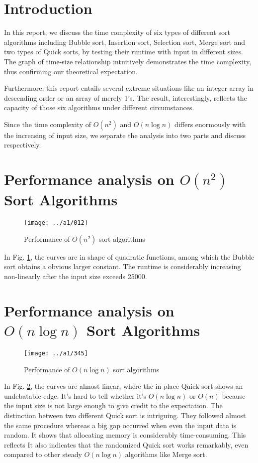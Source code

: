 
\section{Introduction}
In this report, we discuss the time complexity of six types of different sort algorithms including Bubble sort, Insertion sort, Selection sort, Merge sort and two types of Quick sorts, by testing their runtime with input in different sizes. The graph of time-size relationship intuitively demonstrates the time complexity, thus confirming our theoretical expectation.

Furthermore, this report entails several extreme situations like an integer array in descending order or an array of merely 1's. The result, interestingly, reflects the capacity of those six algorithms under different circumstances.

Since the time complexity of $O(n^2)$ and $O(n\log n)$ differs enormously with the increasing of input size, we separate the analysis into two parts and discuss respectively.

\section{Performance analysis on $O(n^2)$ Sort Algorithms}
\begin{figure}[H]
    \centering
    \texttt{[image: ../a1/012]}
    \caption{Performance of $O(n^2)$ sort algorithms}\label{012}
\end{figure}
In Fig. \ref{012}, the curves are in shape of quadratic functions, among which the Bubble sort obtains a obvious larger constant. The runtime is considerably increasing non-linearly after the input size exceeds 25000.

\section{Performance analysis on $O(n\log n)$ Sort Algorithms}
\begin{figure}[H]
    \centering
    \texttt{[image: ../a1/345]}
    \caption{Performance of $O(n\log n)$ sort algorithms}\label{345}
\end{figure}
In Fig. \ref{345}, the curves are almost linear, where the in-place Quick sort shows an undebatable edge. It's hard to tell whether it's $O(n\log n)$ or $O(n)$ because the input size is not large enough to give credit to the expectation. The distinction between two different Quick sort is intriguing. They followed almost the same procedure whereas a big gap occurred when even the input data is random. It shows that allocating memory is considerably time-consuming. This reflects It also indicates that the randomized Quick sort works remarkably, even compared to other steady $O(n\log n)$ algorithms like Merge sort.

